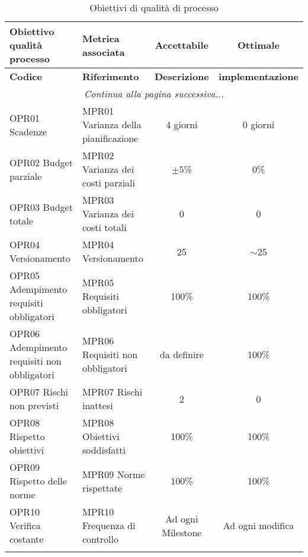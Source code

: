 \documentclass[../piano_di_qualifica.tex]{subfiles}
\begin{document}
\begin{center}
	\begin{longtable}{|p{5.5cm}|p{4.5cm}|c|c|}
		\hline
		\rowcolor{lightgray}
		{\textbf{Obiettivo qualità processo}} & {\textbf{Metrica associata}} & {\textbf{Accettabile}} & {\textbf{Ottimale}} \\
		\hline
		\endfirsthead
	
		\hline
		\rowcolor{lightgray}
		{\textbf{Codice}} & {\textbf{Riferimento}} & {\textbf{Descrizione}}                                                                                                & {\textbf{implementazione}} \\
		\hline
		\endhead
		
		\hline
		\multicolumn{4}{|c|}{\emph{Continua alla pagina successiva...}}\\
		\hline
		\endfoot
		\endlastfoot

		OPR01 Scadenze                              & MPR01 Varianza della pianificazione 	& 4 giorni             	& 0 giorni             	\\
		OPR02 Budget parziale                       & MPR02 Varianza dei costi parziali   	& $\pm$5\%             	& 0\%                  	\\
		OPR03 Budget totale							& MPR03 Varianza dei costi totali	  	& 0						& 0						\\
		OPR04 Versionamento							& MPR04 Versionamento					& 25					& $\sim$25				\\
		OPR05 Adempimento requisiti obbligatori     & MPR05 Requisiti obbligatori         	& 100\%                	& 100\%                	\\
		OPR06 Adempimento requisiti non obbligatori & MPR06 Requisiti non obbligatori     	& da definire          	& 100\%                	\\
		OPR07 Rischi non previsti 					& MPR07 Rischi inattesi					& 2						& 0						\\
		OPR08 Rispetto obiettivi                    & MPR08 Obiettivi soddisfatti         	& 100\%                	& 100\%                	\\
		OPR09 Rispetto delle norme                  & MPR09 Norme rispettate              	& 100\%                	& 100\%                	\\
		OPR10 Verifica costante                     & MPR10 Frequenza di controllo        	& Ad ogni Milestone    	& Ad ogni modifica     	\\
		\hline
		\rowcolor{white}
		\caption{Obiettivi di qualità di processo}
	\end{longtable}
\end{center}
\end{document}
